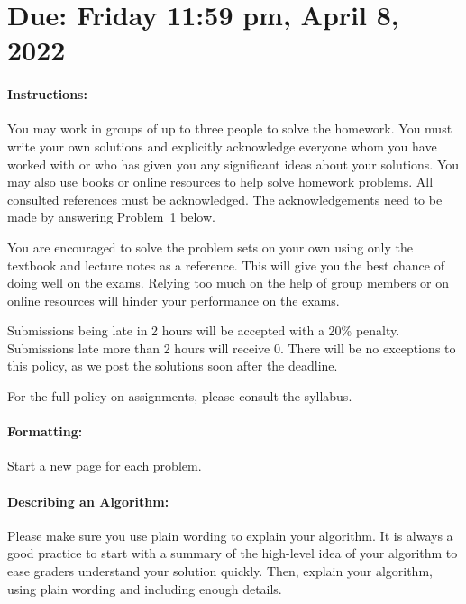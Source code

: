 \documentclass[11pt]{article}
\begin{document}
\maketitle

\section*{Due: Friday 11:59 pm, April 8, 2022}

\paragraph*{Instructions:}

You may work in groups of up to three people to solve the homework.
You must write your own solutions and explicitly acknowledge everyone whom 
you have worked with or who has given you any significant ideas about your solutions. 
You may also use books or online resources to help solve homework problems.  
All consulted references must be acknowledged. The acknowledgements need to be made by answering Problem~1 below.

You are encouraged to solve the problem sets on your own using only the textbook and lecture notes as a reference. This will give you the best chance of doing well on the exams. Relying too much on the help of group members or on online resources will hinder your performance on the exams.

Submissions being late in 2 hours will be accepted with a 20\% penalty. Submissions late more than 2 hours will receive 0. There will be no exceptions to this policy, as we post the solutions soon after the deadline. 

For the full policy on assignments, please consult the syllabus.

\paragraph*{Formatting:} Start a new page for each problem.

\paragraph*{Describing an Algorithm:} Please make sure you use plain wording to explain your algorithm. It is always a good practice to start with a summary of the high-level idea of your algorithm to ease graders understand your solution quickly. Then, explain your algorithm, using plain wording and including enough details.
\end{document}
